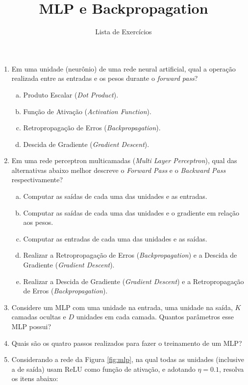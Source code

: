 \documentclass{dlproblemset}
\title{MLP e Backpropagation}
\subtitle{Lista de Exercícios}
\begin{document}
\begin{enumerate}[1)]

    \item Em uma unidade (neurônio) de uma rede neural artificial, qual a operação realizada entre as entradas e os pesos durante o \textit{forward pass}?
    \begin{enumerate}[(a)]
        \item Produto Escalar (\textit{Dot Product}).
        \item Função de Ativação (\textit{Activation Function}).
        \item  Retropropagação de Erros (\textit{Backpropagation}).
        \item Descida de Gradiente (\textit{Gradient Descent}).
    \end{enumerate}

    \item Em uma rede perceptron multicamadas (\textit{Multi Layer Perceptron}), qual das alternativas abaixo melhor descreve o \textit{Forward Pass} e o \textit{Backward Pass} respectivamente?
    \begin{enumerate}[(a)]
        \item Computar as saídas de cada uma das unidades e as entradas.
        \item Computar as saídas de cada uma das unidades e o gradiente em relação aos pesos.
        \item Computar as entradas de cada uma das unidades e as saídas.
        \item  Realizar a Retropropagação de Erros (\textit{Backpropagation}) e a Descida de Gradiente (\textit{Gradient Descent}).
        \item  Realizar a Descida de Gradiente (\textit{Gradient Descent}) e a Retropropagação de Erros (\textit{Backpropagation}).
    \end{enumerate}

    \item Considere um MLP com uma unidade na entrada, uma unidade na saída, $K$ camadas ocultas e $D$ unidades em cada camada. Quantos parâmetros esse MLP possui?

    \item Quais são os quatro passos realizados para fazer o treinamento de um MLP?

    \item Considerando a rede da Figura \ref{fig:mlp}, na qual todas as unidades (inclusive a de saída) usam ReLU como função de ativação, e adotando $\eta = 0.1$, resolva os itens abaixo:


\end{enumerate}
\end{document}
